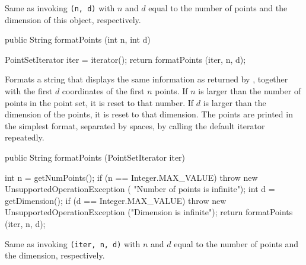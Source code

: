 \begin{tabb}
   Same as invoking \texttt{(n, d)} with $n$ and $d$ equal to the
   number of points and the dimension of this object, respectively.
\end{tabb}
\begin{htmlonly}
\end{htmlonly}
\begin{code}

   public String formatPoints (int n, int d) \begin{hide} {
      PointSetIterator iter = iterator();
      return formatPoints (iter, n, d);
   }\end{hide}
\end{code}
\begin{tabb}
   Formats a string that displays the same information as returned by
  , together with the first $d$ coordinates of the
   first $n$ points. If $n$ is larger than the number of points in the point
  set, it is reset to that number. If $d$ is larger than the dimension of the
 points, it is reset to that dimension. The points are printed in the
  simplest format, separated by spaces,  by calling the default iterator
   repeatedly.
\end{tabb}
\begin{htmlonly}
\end{htmlonly}
\begin{code}

   public String formatPoints (PointSetIterator iter) \begin{hide} {
      int n = getNumPoints();
      if (n == Integer.MAX_VALUE)
         throw new UnsupportedOperationException (
            "Number of points is infinite");
      int d = getDimension();
      if (d == Integer.MAX_VALUE)
         throw new UnsupportedOperationException ("Dimension is infinite");
      return formatPoints (iter, n, d);
   }\end{hide}
\end{code}
\begin{tabb}
    Same as invoking \texttt{(iter, n, d)}
    with $n$ and $d$ equal to the number of points and the dimension, respectively.
\end{tabb}
